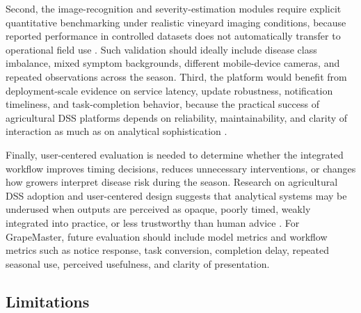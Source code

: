 \documentclass[11pt,a4paper]{article}
\begin{document}
Second, the image-recognition and severity-estimation modules require explicit quantitative benchmarking under realistic vineyard imaging conditions, because reported performance in controlled datasets does not automatically transfer to operational field use \citep{Kunduracioglu2024GrapeDeepLearning,Portela2024GrapevineSensingReview}. Such validation should ideally include disease class imbalance, mixed symptom backgrounds, different mobile-device cameras, and repeated observations across the season. Third, the platform would benefit from deployment-scale evidence on service latency, update robustness, notification timeliness, and task-completion behavior, because the practical success of agricultural DSS platforms depends on reliability, maintainability, and clarity of interaction as much as on analytical sophistication \citep{Walling2020EDSS,Zhai2020Agriculture40DSS}.

Finally, user-centered evaluation is needed to determine whether the integrated workflow improves timing decisions, reduces unnecessary interventions, or changes how growers interpret disease risk during the season. Research on agricultural DSS adoption and user-centered design suggests that analytical systems may be underused when outputs are perceived as opaque, poorly timed, weakly integrated into practice, or less trustworthy than human advice \citep{Rose2018UserCentredDSS,Gent2011AdoptionBarriers,Gutierrez2019VisualizationReview}. For GrapeMaster, future evaluation should include model metrics and workflow metrics such as notice response, task conversion, completion delay, repeated seasonal use, perceived usefulness, and clarity of presentation.

\subsection{Limitations}
\end{document}
